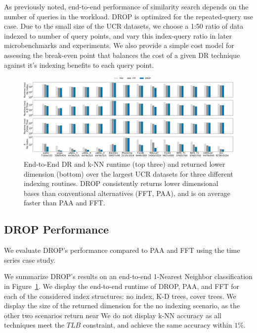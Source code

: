 As previously noted, end-to-end performance of similarity search depends on the number of queries in the workload. 
DROP is optimized for the repeated-query use case. 
Due to the small size of the UCR datasets, we choose a 1:50 ratio of data indexed to number of query points, and vary this index-query ratio in later microbenchmarks and experiments. 
We also provide a simple cost model for assessing the break-even point that balances the cost of a given DR technique against it's indexing benefits to each query point.


\begin{figure}[t!]
\includegraphics[width=\linewidth]{figs/KNNraw-revision.pdf}
\caption[]{End-to-End DR and k-NN runtime (top three) and returned lower dimension (bottom) over the largest UCR datasets for three different indexing routines. DROP consistently returns lower dimensional bases than conventional alternatives (FFT, PAA), and is on average faster than PAA and FFT.}
\label{fig:knnAll}
\end{figure}


\subsection{DROP Performance}
\label{subsec:runtime}


We evaluate DROP's performance compared to PAA and FFT using the time series case study. 

 We summarize DROP's results on an end-to-end 1-Nearest Neighbor classification in Figure~\ref{fig:knnAll}.
We display the end-to-end runtime of DROP, PAA, and FFT for each of the considered index structures: no index, K-D trees, cover trees. 
We display the size of the returned dimension for the no indexing scenario, as the other two scenarios return near 
We do not display k-NN accuracy as all techniques meet the $TLB$ constraint, and achieve the same accuracy within $1\%$.

